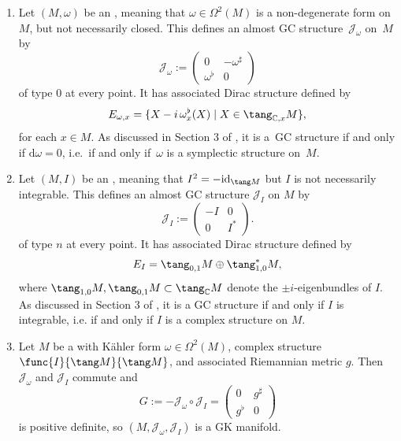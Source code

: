 \begin{Example} \label{example4} \qquad
\begin{enumerate}\itemsep=0pt
\item Let $(M,\omega)$ be an , meaning that $\omega \in \Omega^2(M)$ is a non-degenerate form on $M$, but not necessarily closed.  This def\/ines an almost GC structure~$\mathcal{J}_{\omega}$ on~$M$ by
\[
  \mathcal{J}_{\omega} :=
  \begin{pmatrix}
    0 & - \omega^{\sharp} \\
    \omega^{\flat} & 0
  \end{pmatrix}
\] of type $0$ at every point.
It has associated Dirac structure def\/ined by
\[
  E_{\omega, x}
  =
  \{ X - i \, \omega^{\flat}_x(X)
  \mid X \in \tang_{\mathbb{C}, x} M \},
\]
for each $x \in M$.  As discussed in Section 3 of \cite{gualtieri}, it is a~GC structure if and only if $\mathrm{d} \omega = 0$, i.e.\ if and only if~$\omega$ is a symplectic structure on~$M$.

\item Let $(M,I)$ be an , meaning that $I^2 = -\mathrm{id}_{\tang M}$ but $I$ is not necessarily integrable.  This def\/ines an almost GC structure $\mathcal{J}_{I}$ on $M$ by
\[
  \mathcal{J}_{I}
  :=
  \begin{pmatrix}
  -I & 0 \\
  0 & I^*
  \end{pmatrix}.
\]
of type $n$ at every point.  It has associated Dirac structure def\/ined by
\[
  E_{I}
  = \tang_{0,1} M \oplus \tang_{1,0}^* M,
\]
where $\tang_{1,0} M, \tang_{0,1} M \subset \tang_{\mathbb{C}} M$ denote the $\pm i$-eigenbundles of $I$.
 As discussed in Section 3 of \cite{gualtieri}, it is a GC structure if and only if $I$ is integrable, i.e. if and only if $I$ is a complex structure on $M$.

\item Let $M$ be a  with K\"ahler form $\omega \in \Omega^2(M)$, complex structure $\func{I}{\tang M}{\tang M}$, and associated Riemannian metric $g$.  Then $\mathcal{J}_\omega$ and $\mathcal{J}_I$ commute and
\[
  G:=-\mathcal{J}_{\omega} \circ \mathcal{J}_I
  = \begin{pmatrix} 0 & g^{\sharp} \\ g^{\flat} & 0 \end{pmatrix}
\]
is positive def\/inite, so $(M, \mathcal{J}_{\omega}, \mathcal{J}_I)$ is a GK manifold.
\end{enumerate}
\end{Example}


